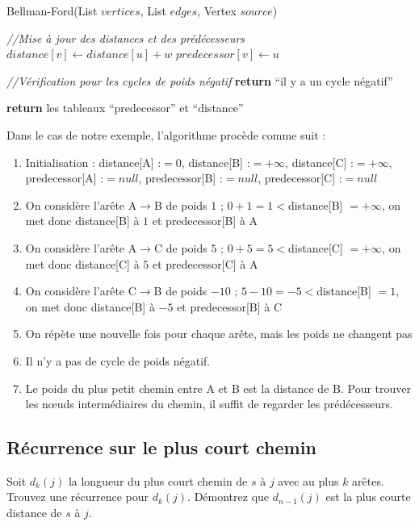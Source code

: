 \begin{solution}
\begin{algorithm}{Bellman-Ford(List $vertices$, List $edges$, Vertex $source$)}
\begin{algorithmic}
				\medskip
				\STATE \textit{//Mise à jour des distances et des prédécesseurs}
							\STATE $distance[v] \leftarrow distance[u] + w$
							\STATE $predecessor[v] \leftarrow u$
						\ENDIF
					\ENDFOR
				\ENDFOR

				\medskip
				\STATE \textit{//Vérification pour les cycles de poids négatif}
						\STATE \textbf{return} ``il y a un cycle négatif''
					\ENDIF
				\ENDFOR
				\medskip

				\STATE \textbf{return} les tableaux ``predecessor'' et ``distance''
			\end{algorithmic}
		\end{algorithm}

		Dans le cas de notre exemple, l'algorithme procède comme suit :
		\begin{enumerate}
			\item Initialisation : distance[A] :$= 0$, distance[B] :$= +\infty$, distance[C] :$= +\infty$, predecessor[A] :$= null$, predecessor[B] :$= null$, predecessor[C] :$= null$
			\item On considère l'arête A$\rightarrow$B de poids $1$ ; $0 + 1 = 1 < $distance[B] $= +\infty$, on met donc distance[B] à $1$ et predecessor[B] à A
			\item On considère l'arête A$\rightarrow$C de poids $5$ ; $0 + 5 = 5 < $distance[C] $= +\infty$, on met donc distance[C] à $5$ et predecessor[C] à A
			\item On considère l'arête C$\rightarrow$B de poids $-10$ ; $5 - 10 = -5 < $distance[B] $= 1$, on met donc distance[B] à $-5$ et predecessor[B] à C
			\item On répète une nouvelle fois pour chaque arête, mais les poids ne changent pas
			\item Il n'y a pas de cycle de poids négatif.
			\item Le poids du plus petit chemin entre A et B est la distance de B. Pour trouver les nœuds intermédiaires du chemin, il suffit de regarder les prédécesseurs.
		\end{enumerate}
\end{solution}

\subsection{Récurrence sur le plus court chemin} Soit $d_k(j)$ la longueur du plus court chemin de $s$ à $j$ avec au plus $k$ arêtes. Trouvez une récurrence pour $d_k(j)$. Démontrez que $d_{n-1}(j)$ est la plus courte distance de $s$ à $j$.

